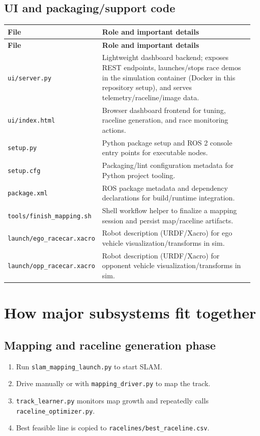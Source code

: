 \documentclass[11pt]{article}
\begin{document}
\subsection{UI and packaging/support code}
\begin{longtable}{p{0.30\linewidth}p{0.66\linewidth}}
\toprule
\textbf{File} & \textbf{Role and important details} \\
\midrule
\endfirsthead
\toprule
\textbf{File} & \textbf{Role and important details} \\
\midrule
\endhead
\texttt{ui/server.py} & Lightweight dashboard backend; exposes REST endpoints, launches/stops race demos in the simulation container (Docker in this repository setup), and serves telemetry/raceline/image data. \\
\texttt{ui/index.html} & Browser dashboard frontend for tuning, raceline generation, and race monitoring actions. \\
\texttt{setup.py} & Python package setup and ROS 2 console entry points for executable nodes. \\
\texttt{setup.cfg} & Packaging/lint configuration metadata for Python project tooling. \\
\texttt{package.xml} & ROS package metadata and dependency declarations for build/runtime integration. \\
\texttt{tools/finish\_mapping.sh} & Shell workflow helper to finalize a mapping session and persist map/raceline artifacts. \\
\texttt{launch/ego\_racecar.xacro} & Robot description (URDF/Xacro) for ego vehicle visualization/transforms in sim. \\
\texttt{launch/opp\_racecar.xacro} & Robot description (URDF/Xacro) for opponent vehicle visualization/transforms in sim. \\
\bottomrule
\end{longtable}

\section{How major subsystems fit together}
\subsection{Mapping and raceline generation phase}
\begin{enumerate}
  \item Run \texttt{slam\_mapping\_launch.py} to start SLAM.
  \item Drive manually or with \texttt{mapping\_driver.py} to map the track.
  \item \texttt{track\_learner.py} monitors map growth and repeatedly calls \texttt{raceline\_optimizer.py}.
  \item Best feasible line is copied to \texttt{racelines/best\_raceline.csv}.
\end{enumerate}
\end{document}
